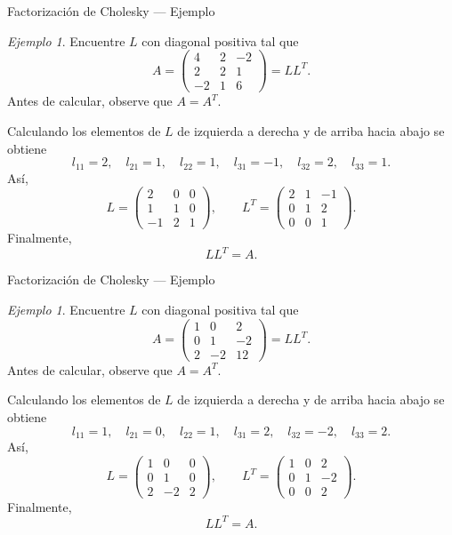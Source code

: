 \documentclass[aspectratio=169,11pt]{beamer}
\theoremstyle{remark}
\newtheorem{Ejem}[definicion]{Ejemplo}
\begin{document}
\begin{frame}[shrink=5]{Factorización de Cholesky — Ejemplo}
\footnotesize
\begin{Ejem}
Encuentre $L$ con diagonal positiva tal que
\[
A=\begin{pmatrix}4 & 2 & -2\\2 & 2 & 1\\-2 & 1 & 6\end{pmatrix}=LL^T.
\]
Antes de calcular, observe que $A=A^T$.


Calculando los elementos de $L$ de izquierda a derecha y de arriba hacia abajo se obtiene
\[
l_{11}=2,\quad l_{21}=1,\quad l_{22}=1,\quad l_{31}=-1,\quad l_{32}=2,\quad l_{33}=1.
\]
Así,
\[
L=\begin{pmatrix}2 & 0 & 0\\1 & 1 & 0\\-1 & 2 & 1\end{pmatrix},\qquad L^T=\begin{pmatrix}2 & 1 & -1\\0 & 1 & 2\\0 & 0 & 1\end{pmatrix}.
\]
Finalmente,
\[
\boxed{LL^T=A}.
\]

\end{Ejem}
\end{frame}

\begin{frame}[shrink=5]{Factorización de Cholesky — Ejemplo}
\footnotesize
\begin{Ejem}

Encuentre $L$ con diagonal positiva tal que
\[
A=\begin{pmatrix}1 & 0 & 2\\0 & 1 & -2\\2 & -2 & 12\end{pmatrix}=LL^T.
\]
Antes de calcular, observe que $A=A^T$.

Calculando los elementos de $L$ de izquierda a derecha y de arriba hacia abajo se obtiene
\[
l_{11}=1,\quad l_{21}=0,\quad l_{22}=1,\quad l_{31}=2,\quad l_{32}=-2,\quad l_{33}=2.
\]
Así,
\[
L=\begin{pmatrix}1 & 0 & 0\\0 & 1 & 0\\2 & -2 & 2\end{pmatrix},\qquad L^T=\begin{pmatrix}1 & 0 & 2\\0 & 1 & -2\\0 & 0 & 2\end{pmatrix}.
\]
Finalmente,
\[
\boxed{LL^T=A}.
\]
\end{Ejem}
\end{frame}
\end{document}
